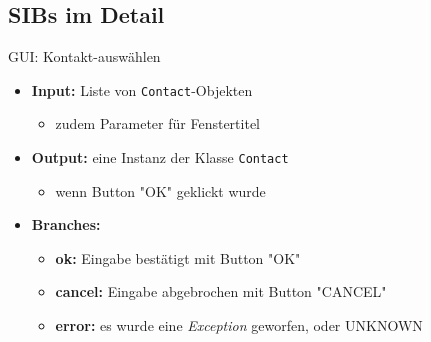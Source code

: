 \subsection*{SIBs im Detail}
\begin{frame}{GUI: Kontakt-auswählen}
\begin{itemize}[<+->]
	\item \textbf{Input:} Liste von \texttt{Contact}-Objekten
		\begin{itemize}[<+->]
			\item zudem Parameter für Fenstertitel
		\end{itemize}
	\item \textbf{Output:} eine Instanz der Klasse \texttt{Contact}
		\begin{itemize}[<+->]
			\item wenn Button "OK" geklickt wurde
		\end{itemize}

	\item \textbf{Branches:}
		\begin{itemize}[<+->]
			\item \textbf{ok:} Eingabe bestätigt mit Button "OK"
			\item \textbf{cancel:} Eingabe abgebrochen mit Button "CANCEL"
			\item \textbf{error:} es wurde eine \textit{Exception} geworfen, oder UNKNOWN
		\end{itemize}

\end{itemize}
\end{frame}


